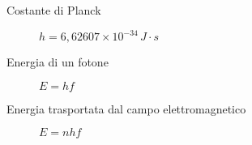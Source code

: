 \documentclass[a4paper,11pt,italian]{article}
\begin{document}
\begin{description}
%   
  
  \item[Costante di Planck]
  $ h = 6,62607 \times 10^{-34} \, J\cdot s $

  \item[Energia di un fotone] $ E=hf $
  
  \item[Energia trasportata dal campo elettromagnetico]
  $ E=nhf $

  
  
%   
%   
%   
%   
%   
  

\end{description}
\end{document}
